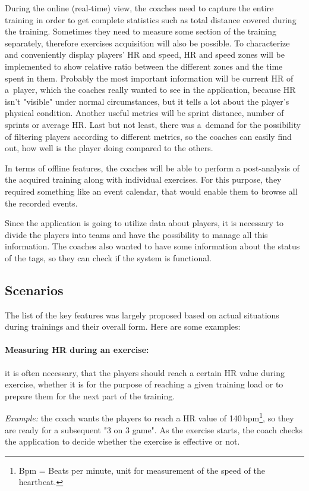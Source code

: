 During the online (real-time) view, the coaches need to capture the entire training in order to get complete statistics such as total distance covered during the training. Sometimes they need to measure some section of the training separately, therefore exercises acquisition will also be possible. To characterize and conveniently display players’ HR and speed, HR and speed zones will be implemented to show relative ratio between the different zones and the time spent in them. Probably the most important information will be current HR of a~player, which the coaches really wanted to see in the application, because HR isn't "visible" under normal circumstances, but it tells a lot about the player’s physical condition. Another useful metrics will be sprint distance, number of sprints or average HR. Last but not least, there was a~demand for the possibility of filtering players according to different metrics, so the coaches can easily find out, how well is the player doing compared to the others.

In terms of offline features, the coaches will be able to perform a post-analysis of the acquired training along with individual exercises. For this purpose, they required something like an event calendar, that would enable them to browse all the recorded events.

Since the application is going to utilize data about players, it is necessary to divide the players into teams and have the possibility to manage all this information. The coaches also wanted to have some information about the status of the tags, so they can check if the system is functional.

\subsection{Scenarios}
The list of the key features was largely proposed based on actual situations during trainings and their overall form. Here are some examples:

\paragraph{Measuring HR during an exercise:} it is often necessary, that the players should reach a certain HR value during exercise, whether it is for the purpose of reaching a given training load or to prepare them for the next part of the training.

{\it Example:} the coach wants the players to reach a HR value of 140\,bpm\footnote{Bpm = Beats per minute, unit for measurement of the speed of the heartbeat.}, so they are ready for a subsequent "3 on 3 game". As the exercise starts, the coach checks the application to decide whether the exercise is effective or not.


